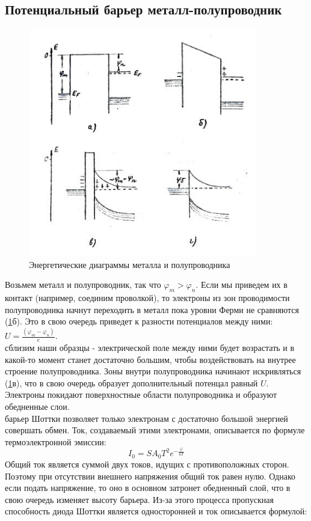 \documentclass[a4paper,12pt]{article} %
\begin{document}
\subsection{Потенциальный барьер металл-полупроводник}
\begin{figure}[h!]
    \centering
        \includegraphics[width=10cm]{energ_2.jpg}
    \caption{Энергетические диаграммы металла и полупроводника}
    \label{2}
\end{figure}
Возьмем металл и полупроводник, так что $\varphi_m>\varphi_n$. Если мы приведем их в контакт (например, соединим проволкой), то электроны из зон проводимости полупроводника начнут переходить в металл пока уровни Ферми не сравняются (\ref{2}б). Это в свою очередь приведет к разности потенциалов между ними: $U=\frac{(\varphi_m-\varphi_n)}{e}$. \\
 сблизим наши образцы - электрической поле между ними будет возрастать и в какой-то момент станет достаточно большим, чтобы воздействовать на внутрее строение полупроводника. Зоны внутри полупроводника начинают искривляться (\ref{2}в), что в свою очередь образует дополнительный потенцал равный $U$. Электроны покидают поверхностные области полупроводника и образуют обедненные слои.\\
 барьер Шоттки позволяет только электронам с достаточно большой энергией совершать обмен. Ток, создаваемый этими электронами, описывается по формуле термоэлектронной эмиссии:
\begin{equation}
    I_0=SA_0T^2e^{-\frac{\varphi}{kT}}
\end{equation}
Общий ток является суммой двух токов, идущих с противоположных сторон. Поэтому при отсутствии внешнего напряжения общий ток равен нулю. Однако если подать напряжение, то оно в основном затронет обедненный слой, что в свою очередь изменяет высоту барьера. Из-за этого процесса пропускная способность диода Шоттки является односторонней и ток описывается формулой:
\end{document}
